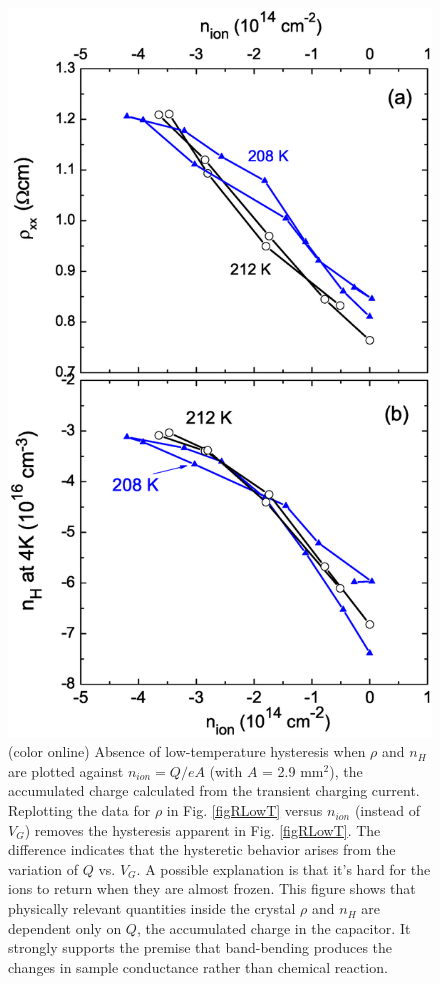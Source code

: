 \begin{figure}[!htbp]
  \begin{center}
\includegraphics[width=0.7\linewidth]{ch-appendicies/figures/FigRvsNion.eps}
\caption{\label{figNion} (color online) 
Absence of low-temperature hysteresis when $\rho$ and $n_H$ are plotted against $n_{ion}=Q/eA$ (with $A$ = 2.9 mm$^2$), the accumulated charge calculated from the transient charging current.
Replotting the data for $\rho$ in Fig. \ref{figRLowT} versus $n_{ion}$ (instead of $V_G$) removes the hysteresis apparent in Fig. \ref{figRLowT}.
The difference indicates that the hysteretic behavior arises from the variation of $Q$ vs. $V_G$. A possible explanation is that it's hard for the ions to return when they are almost frozen. This figure shows that physically relevant quantities inside the
crystal $\rho$ and $n_H$ are dependent only on $Q$, the accumulated charge in the capacitor. It strongly supports the premise that band-bending 
produces the changes in sample conductance rather than chemical reaction.}
  \end{center}
\end{figure} 




